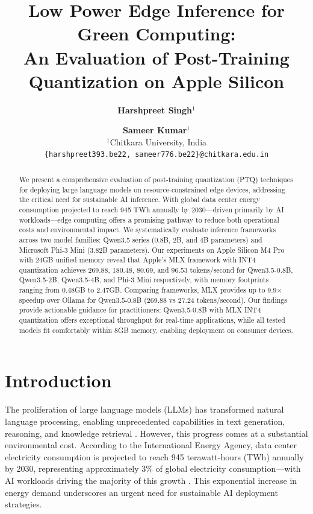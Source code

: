 \documentclass[11pt,a4paper]{article}
\title{\bfseries\Large Low Power Edge Inference for Green Computing: \\ 
An Evaluation of Post-Training Quantization on Apple Silicon}
\author{
  \textbf{Harshpreet Singh}$^{1}$ \and \textbf{Sameer Kumar}$^{1}$ \\[6pt]
  $^{1}$Chitkara University, India \\[3pt]
  \texttt{\{harshpreet393.be22, sameer776.be22\}@chitkara.edu.in}
}
\date{}
\begin{document}
\maketitle

\begin{abstract}
\noindent We present a comprehensive evaluation of post-training quantization (PTQ) techniques for deploying large language models on resource-constrained edge devices, addressing the critical need for sustainable AI inference. With global data center energy consumption projected to reach 945 TWh annually by 2030—driven primarily by AI workloads—edge computing offers a promising pathway to reduce both operational costs and environmental impact. We systematically evaluate inference frameworks across two model families: Qwen3.5 series (0.8B, 2B, and 4B parameters) and Microsoft Phi-3 Mini (3.82B parameters). Our experiments on Apple Silicon M4 Pro with 24GB unified memory reveal that Apple's MLX framework with INT4 quantization achieves 269.88, 180.48, 80.69, and 96.53 tokens/second for Qwen3.5-0.8B, Qwen3.5-2B, Qwen3.5-4B, and Phi-3 Mini respectively, with memory footprints ranging from 0.48GB to 2.47GB. Comparing frameworks, MLX provides up to 9.9$\times$ speedup over Ollama for Qwen3.5-0.8B (269.88 vs 27.24 tokens/second). Our findings provide actionable guidance for practitioners: Qwen3.5-0.8B with MLX INT4 quantization offers exceptional throughput for real-time applications, while all tested models fit comfortably within 8GB memory, enabling deployment on consumer devices.
\end{abstract}

\section{Introduction}

The proliferation of large language models (LLMs) has transformed natural language processing, enabling unprecedented capabilities in text generation, reasoning, and knowledge retrieval \cite{brown2020language, openai2023gpt4}. However, this progress comes at a substantial environmental cost. According to the International Energy Agency, data center electricity consumption is projected to reach 945 terawatt-hours (TWh) annually by 2030, representing approximately 3\% of global electricity consumption—with AI workloads driving the majority of this growth \cite{iea2025energyai}. This exponential increase in energy demand underscores an urgent need for sustainable AI deployment strategies.
\end{document}
